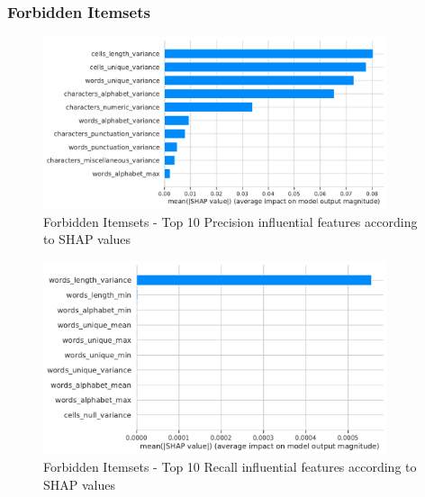 \subsubsection{Forbidden Itemsets}
\begin{figure}[H]
    \centering
    \includegraphics[width=0.9\textwidth]{thesis/Figures/RQ4/Shap_cell_prec_ForbiddenItemsets.pdf}
    \caption{Forbidden Itemsets - Top 10 Precision influential features according to SHAP values}
    \label{fig:feature_importance_prec_ForbiddenItemsets}
\end{figure}
\begin{figure}[H]
    \centering
    \includegraphics[width=0.9\textwidth]{thesis/Figures/RQ4/Shap_cell_rec_ForbiddenItemsets.pdf}
    \caption{Forbidden Itemsets - Top 10 Recall influential features according to SHAP values}
    \label{fig:feature_importance_rec_ForbiddenItemsets}
\end{figure}

